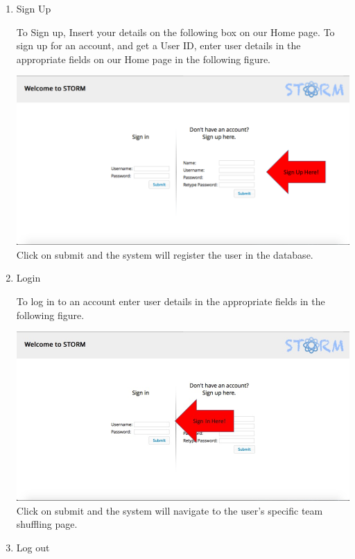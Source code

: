 \begin{enumerate}
\item Sign Up\par

To Sign up, Insert your details on the following box on our Home page.
To sign up for an account, and get a User ID, enter user details in the appropriate fields on our Home page in the following figure.\par

\includegraphics[width=13cm]{./graphics/StormUMSU1.jpg}
Click on submit and the system will register the user in the database.

\item Login\par
To log in to an account enter user details in the appropriate fields in the following figure.\par
\includegraphics[width=13cm]{./graphics/StormUMSU2.jpg}
Click on submit and the system will navigate to the user's specific team shuffling page.

\item Log out\par
\end{enumerate}